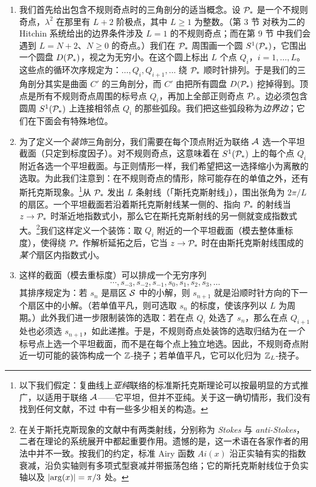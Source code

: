 \begin{enumerate}

\item 我们首先给出包含不规则奇点时的三角剖分的适当概念。设 $\mathcal{P}_*$ 是一个不规则奇点，$\lambda^2$ 在那里有 $L+2$ 阶极点，其中 $L \geq 1$ 为整数。（第 3 节%
对秩为二的 Hitchin 系统给出的边界条件涉及 $L = 1$ 的不规则奇点；而在第 9 节%
中我们会遇到 $L = N+2$、$N\geq 0$ 的奇点。）我们在 $\mathcal{P}_*$ 周围画一个圆 $S^1(\mathcal{P}_*)$，它围出一个圆盘 $D(\mathcal{P}_*)$，视之为无穷小。在这个圆上标出 $L$ 个点 $Q_i$，$i=1, \dots, L$。这些点的循环次序规定为：$\dots, Q_i, Q_{i+1}, \dots$ 绕 $\mathcal{P}_*$ 顺时针排列。于是我们的三角剖分其实是曲面 $C'$ 的三角剖分，而 $C'$ 由把所有圆盘 $D(\mathcal{P}_*)$ 挖掉得到。顶点是所有不规则奇点周围的标号点 $Q_i$，再加上全部正则奇点 $\mathcal{P}_i$。边必须包含圆周 $S^1(\mathcal{P}_*)$ 上连接相邻点 $Q_i$ 的那些弧段。我们把这些弧段称为\emph{边界边}；它们在下面会有特殊地位。

\item 为了定义一个\emph{装饰}三角剖分，我们需要在每个顶点附近为联络 $\mathcal{A}$ 选一个平坦截面（只定到标度因子）。对不规则奇点，这意味着在 $S^1(\mathcal{P}_*)$ 上的每个点 $Q_i$ 附近各选一个平坦截面。与正则情形一样，我们希望把这一选择缩小为离散的选取。为此我们注意到：在不规则奇点的情形，除可能存在的单值之外，还有斯托克斯现象。\footnote{以下我们假定：复曲线上\emph{亚纯}联络的标准斯托克斯理论可以按最明显的方式推广，以适用于联络 $\mathcal{A}$——它平坦，但并不亚纯。关于这一确切情形，我们没有找到任何文献，不过 \cite{MR1864833} 中有一些多少相关的构造。}从 $\mathcal{P}_*$ 发出 $L$ 条射线（「斯托克斯射线」），围出张角为 $2\pi/L$ 的扇区。一个平坦截面若沿着斯托克斯射线某一侧的、指向 $\mathcal{P}_*$ 的射线当 $z \to \mathcal{P}_*$ 时渐近地指数式小，那么它在斯托克斯射线的另一侧就变成指数式大。\footnote{在关于斯托克斯现象的文献中有两类射线，分别称为 \emph{Stokes} 与 \emph{anti-Stokes}，二者在理论的系统展开中都起重要作用。遗憾的是，这一术语在各家作者的用法中并不一致。按我们的约定，标准 Airy 函数 $Ai(x)$ 沿正实轴有实的指数衰减，沿负实轴则有多项式型衰减并带振荡包络；它的斯托克斯射线位于负实轴以及 $\vert {\rm arg}(x)\vert = \pi/3$ 处。}我们这样定义一个装饰：取 $Q_i$ 附近的一个平坦截面（模去整体重标度），使得绕 $\mathcal{P}_*$ 作解析延拓之后，它当 $z \to \mathcal{P}_*$ 时在由斯托克斯射线围成的\emph{某个}扇区内指数式小。

\item 这样的截面（模去重标度）可以排成一个无穷序列
\begin{equation}\label{eq:bisequenceStokes}
\cdots, s_{-3}, s_{-2}, s_{-1}, s_0, s_1, s_2, s_3, \dots
\end{equation}
其排序规定为：若 $s_n$ 是扇区 $\mathcal{S}$ 中的小解，则 $s_{n+1}$ 就是沿顺时针方向的下一个扇区中的小解。（若单值平凡，则可选取 $s_n$ 的标度，使该序列以 $L$ 为周期。）此外我们进一步限制装饰的选取：若在点 $Q_i$ 处选了 $s_n$，那么在点 $Q_{i+1}$ 处也必须选 $s_{n+1}$，如此递推。于是，不规则奇点处装饰的选取归结为在\emph{一个}标号点上选一个平坦截面，而不是在每个点上独立地选。因此，不规则奇点附近一切可能的装饰构成一个 $\mathbb{Z}$-挠子；若单值平凡，它可以化归为 $\mathbb{Z}_L$-挠子。


\end{enumerate}
